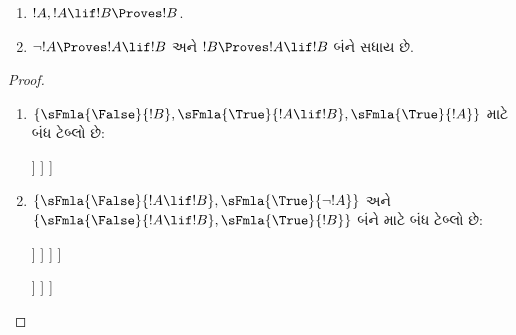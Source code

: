\begin{prop}
  \begin{enumerate}
  \item {} $!A, !A \lif !B \Proves !B$.
  \item {}
    $\lnot !A \Proves !A \lif !B$ અને $!B \Proves !A \lif !B$ બંને સધાય છે.
  \end{enumerate}
\end{prop}

\begin{proof}
  \begin{enumerate}
    \item $\{\sFmla{\False}{!B}, \sFmla{\True}{!A \lif !B},
      \sFmla{\True}{!A}\}$ માટે બંધ ટેબ્લો છે:
      \begin{oltableau}
        [\sFmla{\False}{\formula{B}}, just=\TAss
          [\sFmla{\True}{\formula{A} \lif \formula{B}}, just=\TAss
            [\sFmla{\True}{\formula{A}}, just=\TAss
              [\sFmla{\False}{\formula{A}}, just = {\TRule{\True}{\lif}[2]}, close]
              [\sFmla{\True}{\formula{B}}, just = {\TRule{\True}{\lif}[2]}, close]
            ]
          ]
        ]
      \end{oltableau}
    \item $\{\sFmla{\False}{!A \lif !B},
      \sFmla{\True}{\lnot !A}\}$ અને $\{\sFmla{\False}{!A \lif !B},
      \sFmla{\True}{!B}\}$ બંને માટે બંધ ટેબ્લો છે:
      \begin{oltableau}
        [\sFmla{\False}{\formula{A} \lif \formula{B}}, just = \TAss
          [\sFmla{\True}{\lnot \formula{A}}, just = \TAss
            [\sFmla{\True}{\formula{A}}, just = {\TRule{\False}{\lif}[1]}
              [\sFmla{\False}{\formula{B}}, just = {\TRule{\False}{\lif}[1]}
                [\sFmla{\False}{\formula{A}}, just = {\TRule{\True}{\lnot}[2]}, close]
              ]
            ]
          ]
        ]
      \end{oltableau}
      \begin{oltableau}
        [\sFmla{\False}{\formula{A} \lif \formula{B}}, just = \TAss
          [\sFmla{\True}{\formula{B}}, just = \TAss
            [\sFmla{\True}{\formula{A}}, just = {\TRule{\False}{\lif}[1]}
              [\sFmla{\False}{\formula{B}}, just = {\TRule{\False}{\lif}[1]},close
              ]
            ]
          ]
        ]
      \end{oltableau}
  \end{enumerate}
\end{proof}
\endgroup


